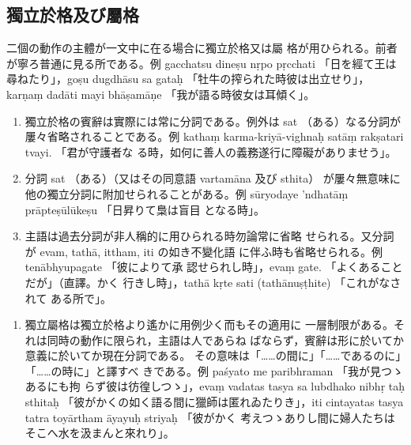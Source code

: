 \subsection{獨立於格及び屬格}
\numberParagraph \label{np:231}
二個の動作の主體が一文中に在る場合に獨立於格又は屬
格が用ひられる。前者が寧ろ普通に見る所である。例 gacchatsu
dineṣu nṛpo pṛcchati 「日を經て王は尋ねたり」，goṣu dugdhāsu
sa gataḥ 「牡牛の搾られた時彼は出立せり」，karṇaṃ dadāti
mayi bhāṣamāṇe 「我が語る時彼女は耳傾く」。
\begin{enumerate}[label=(\alph*)]
\item 獨立於格の賓辭は實際には常に分詞である。例外は sat
（ある）なる分詞が屢々省略されることである。例 kathaṃ
karma-kriyā-vighnaḥ satāṃ rakṣatari tvayi. 「君が守護者な
る時，如何に善人の義務遂行に障礙がありませう」。
\item 分詞 sat （ある）（又はその同意語 vartamāna 及び sthita）
が屢々無意味に他の獨立分詞に附加せられることがある。例
sūryodaye 'ndhatāṃ prāpteṣūlūkeṣu 「日昇りて梟は盲目
となる時」。
\item 主語は過去分詞が非人稱的に用ひられる時勿論常に省略
せられる。又分詞が evam, tathā, ittham, iti の如き不變化語
に伴ふ時も省略せられる。例 tenābhyupagate 「彼によりて承
認せられし時」，evaṃ gate. 「よくあることだが」（直譯。かく
行きし時」，tathā kṛte sati (tathānuṣṭhite) 「これがなされて
ある所で」。
\end{enumerate}
\begin{enumerate}[label=(\arabic*), start=2]
\item 獨立屬格は獨立於格より遙かに用例少く而もその適用に
一層制限がある。それは同時の動作に限られ，主語は人であらね
ばならず，賓辭は形に於いてか意義に於いてか現在分詞である。
その意味は「……の間に」「……であるのに」「……の時に」と譯すべ
きである。例 paśyato me paribhraman 「我が見つゝあるにも拘
らず彼は彷徨しつゝ」，evaṃ vadatas tasya sa lubdhako nibhṛ\-%
taḥ sthitaḥ 「彼がかくの如く語る間に獵師は匿れゐたりき」，iti
cintayatas tasya tatra toyārtham āyayuḥ striyaḥ 「彼がかく
考えつゝありし間に婦人たちはそこへ水を汲まんと來れり」。
\end{enumerate}

